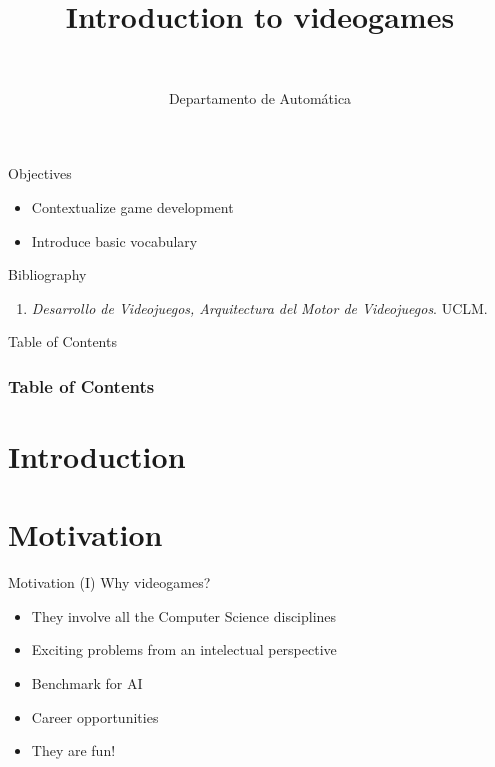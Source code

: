 \documentclass[10pt,compress]{beamer} %
\title[Introduction to videogames]{Introduction to videogames}
\author{\asignatura\\\carrera}
\institute{}
\date{Departamento de Automática}
\begin{document}
{\titlepageBlue
    \begin{frame}
        \titlepage
    \end{frame}
}

\institute{\asignatura}

\begin{frame}[plain]{}
   \begin{block}{Objectives}
   \begin{itemize}
   		\item Contextualize game development
		\item Introduce basic vocabulary
	\end{itemize}
	\end{block}

   \begin{block}{Bibliography}
      \begin{enumerate}
          \item  \textit{Desarrollo de Videojuegos, Arquitectura del Motor de Videojuegos}. UCLM.
      \end{enumerate} 
   \end{block}
\end{frame}


{
\begin{frame}[shrink]{Table of Contents}
 \frametitle{Table of Contents}
 \tableofcontents
\end{frame}
}

\section{Introduction}

\section[Motivation]{Motivation}
\begin{frame}{Motivation (I)}
	Why videogames?
	\begin{itemize}
		\item They involve all the Computer Science disciplines
		\item Exciting problems from an intelectual perspective
		\item Benchmark for AI
		\item Career opportunities
		\item They are fun!
  	\end{itemize}
\end{frame}
\end{document}
